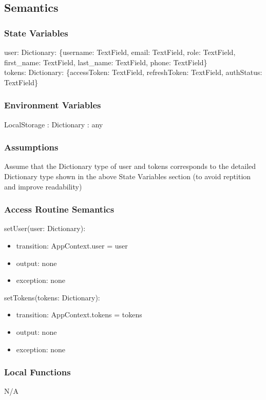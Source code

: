 \documentclass[12pt, titlepage]{article}
\begin{document}
\subsection{Semantics}

\subsubsection{State Variables}
user: Dictionary: \{username: TextField, email: TextField, role: TextField, first\_name: TextField, last\_name: TextField, phone: TextField\}\\
tokens: Dictionary: \{accessToken: TextField, refreshToken: TextField, authStatus: TextField\}\\

\subsubsection{Environment Variables}
LocalStorage : Dictionary : any

\subsubsection{Assumptions}
Assume that the Dictionary type of user and tokens corresponds to the detailed Dictionary type shown in the above State Variables section (to avoid reptition and improve readability)

\subsubsection{Access Routine Semantics}

\noindent setUser(user: Dictionary):
\begin{itemize}
    \item transition: AppContext.user = user
    \item output: none
    \item exception: none
\end{itemize}

\noindent setTokens(tokens: Dictionary):
\begin{itemize}
    \item transition: AppContext.tokens = tokens
    \item output: none
    \item exception: none
\end{itemize}

\subsubsection{Local Functions}
N/A
\end{document}
